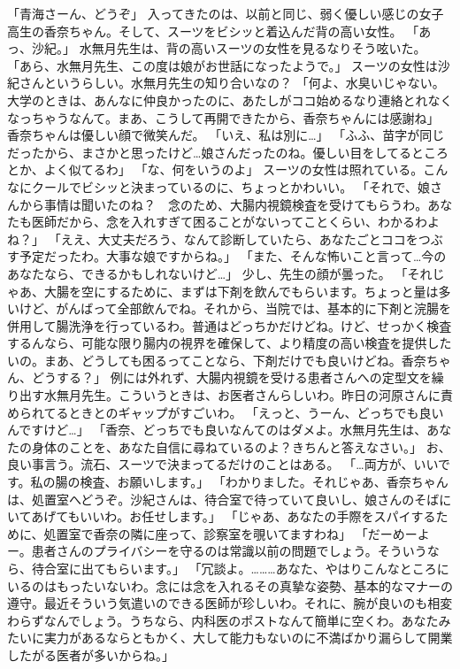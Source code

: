 「青海さーん、どうぞ」
入ってきたのは、以前と同じ、弱く優しい感じの女子高生の香奈ちゃん。そして、スーツをビシッと着込んだ背の高い女性。
「あっ、沙紀。」
水無月先生は、背の高いスーツの女性を見るなりそう呟いた。
「あら、水無月先生、この度は娘がお世話になったようで。」
スーツの女性は沙紀さんというらしい。水無月先生の知り合いなの？
「何よ、水臭いじゃない。大学のときは、あんなに仲良かったのに、あたしがココ始めるなり連絡とれなくなっちゃうなんて。まあ、こうして再開できたから、香奈ちゃんには感謝ね」
香奈ちゃんは優しい顔で微笑んだ。
「いえ、私は別に…」
「ふふ、苗字が同じだったから、まさかと思ったけど…娘さんだったのね。優しい目をしてるところとか、よく似てるわ」
「な、何をいうのよ」
スーツの女性は照れている。こんなにクールでビシッと決まっているのに、ちょっとかわいい。
「それで、娘さんから事情は聞いたのね？　念のため、大腸内視鏡検査を受けてもらうわ。あなたも医師だから、念を入れすぎて困ることがないってことくらい、わかるわよね？」
「ええ、大丈夫だろう、なんて診断していたら、あなたごとココをつぶす予定だったわ。大事な娘ですからね。」
「また、そんな怖いこと言って…今のあなたなら、できるかもしれないけど…」
少し、先生の顔が曇った。
「それじゃあ、大腸を空にするために、まずは下剤を飲んでもらいます。ちょっと量は多いけど、がんばって全部飲んでね。それから、当院では、基本的に下剤と浣腸を併用して腸洗浄を行っているわ。普通はどっちかだけどね。けど、せっかく検査するんなら、可能な限り腸内の視界を確保して、より精度の高い検査を提供したいの。まあ、どうしても困るってことなら、下剤だけでも良いけどね。香奈ちゃん、どうする？」
例には外れず、大腸内視鏡を受ける患者さんへの定型文を繰り出す水無月先生。こういうときは、お医者さんらしいわ。昨日の河原さんに責められてるときとのギャップがすごいわ。
「えっと、うーん、どっちでも良いんですけど…」
「香奈、どっちでも良いなんてのはダメよ。水無月先生は、あなたの身体のことを、あなた自信に尋ねているのよ？きちんと答えなさい。」
お、良い事言う。流石、スーツで決まってるだけのことはある。
「…両方が、いいです。私の腸の検査、お願いします。」
「わかりました。それじゃあ、香奈ちゃんは、処置室へどうぞ。沙紀さんは、待合室で待っていて良いし、娘さんのそばにいてあげてもいいわ。お任せします。」
「じゃあ、あなたの手際をスパイするために、処置室で香奈の隣に座って、診察室を覗いてますわね」
「だーめーよー。患者さんのプライバシーを守るのは常識以前の問題でしょう。そういうなら、待合室に出てもらいます。」
「冗談よ。………あなた、やはりこんなところにいるのはもったいないわ。念には念を入れるその真摯な姿勢、基本的なマナーの遵守。最近そういう気遣いのできる医師が珍しいわ。それに、腕が良いのも相変わらずなんでしょう。うちなら、内科医のポストなんて簡単に空くわ。あなたみたいに実力があるならともかく、大して能力もないのに不満ばかり漏らして開業したがる医者が多いからね。」

